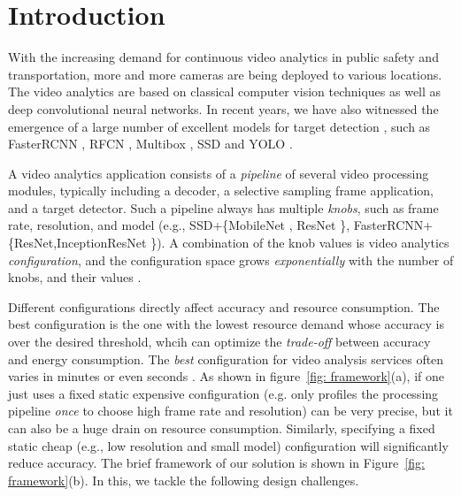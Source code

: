 \section{Introduction}

\label{Section: introduction}
With the increasing demand for continuous video analytics in public safety and transportation, more and more cameras are being deployed to various locations. The video analytics are based on classical computer vision techniques as well as deep convolutional neural networks. In recent years, we have also witnessed the emergence of a large number of excellent models for target detection \cite{trade-offs}, such as FasterRCNN \cite{ren2015faster_rcnn}, RFCN \cite{dai2016r_fcn}, Multibox \cite{szegedy2014multibox}, SSD \cite{liu2016ssd} and YOLO \cite{redmon2016yolo}.


A video analytics application consists of a \emph{pipeline} of several video processing modules, typically including a decoder, a selective sampling frame application, and a target detector. Such a pipeline always has multiple \emph{knobs}, such as frame rate, resolution, and model (e.g., SSD+\{MobileNet \cite{MobileNetV2}, ResNet \cite{he2016resnet}\}, FasterRCNN+\{ResNet,InceptionResNet \cite{szegedy2016inception}\}). A combination of the knob values is video analytics \emph{configuration}, and the configuration space grows \emph{exponentially} with the number of knobs, and their values \cite{jiang2018chameleon}.

Different configurations directly affect accuracy and resource consumption. The best configuration is the one with the lowest resource demand whose accuracy is over the desired threshold, whcih can optimize the \emph{trade-off} between accuracy and energy consumption. The \emph{best} configuration for video analysis services often varies in minutes or even seconds \cite{jiang2018chameleon}. As shown in figure~\ref{fig: framework}(a), if one just uses a fixed static expensive configuration (e.g. only profiles the processing pipeline \emph{once} to choose high frame rate and resolution) can be very precise, but it can also be a huge drain on resource consumption. Similarly, specifying a fixed static cheap (e.g., low resolution and small model) configuration will significantly reduce accuracy. The brief framework of our solution %
is shown in Figure~\ref{fig: framework}(b). In this, we tackle the following design challenges.

